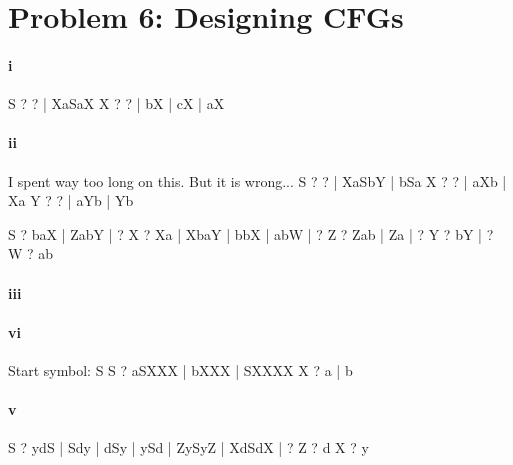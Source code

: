 \documentclass[10pt,letter]{article}
\begin{document}
\section*{Problem 6: Designing CFGs}
\paragraph{i}
S ? ? | XaSaX
X ? ? | bX | cX | aX

\paragraph{ii}
I spent way too long on this. But it is wrong...
S ? ? | XaSbY | bSa
X ? ? | aXb | Xa
Y ? ? | aYb | Yb

S ? baX | ZabY | ?
X ? Xa | XbaY | bbX | abW | ?
Z ? Zab | Za | ?
Y ? bY | ?
W ? ab

\paragraph{iii}


\paragraph{vi}
Start symbol: S
S ? aSXXX | bXXX | SXXXX
X ? a | b

\paragraph{v}
S ? ydS | Sdy | dSy | ySd | ZySyZ | XdSdX | ?
Z ? d
X ? y
\end{document}
